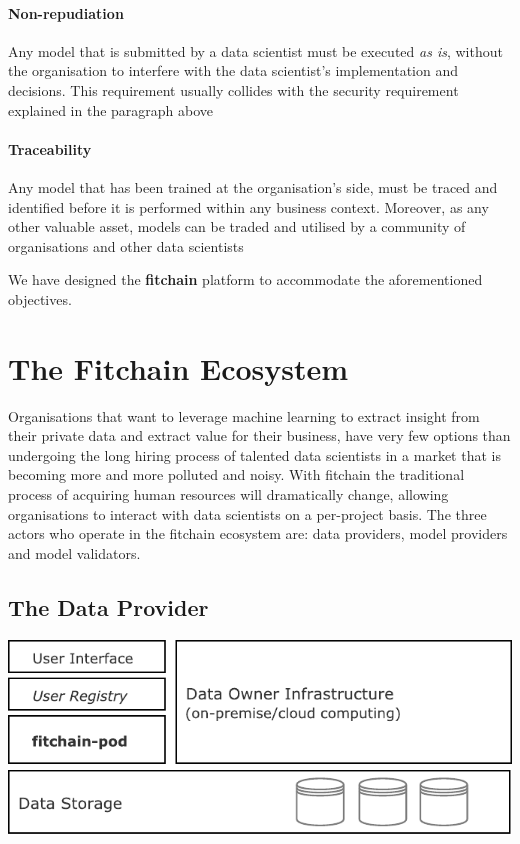 \documentclass[12pt, a4paper,titlepage]{extreport}
\begin{document}
\paragraph{Non-repudiation}
Any model that is submitted by a data scientist must be executed \textit{as is}, without the organisation to interfere with the data scientist's implementation and decisions. This requirement usually collides with the security requirement explained in the paragraph above

\paragraph{Traceability}
Any model that has been trained at the organisation's side, must be traced and identified before it is performed within any business context. Moreover, as any other valuable asset, models can be traded and utilised by a community of organisations and other data scientists

We have designed the \textbf{fitchain} platform to accommodate the aforementioned objectives. 


\section{The Fitchain Ecosystem}\label{ecosystem}
Organisations that want to leverage machine learning to extract insight from their private data and extract value for their business, have very few options than undergoing the long hiring process of talented data scientists in a market that is becoming more and more polluted and noisy\cite{forbesds}. 
With fitchain the traditional process of acquiring human resources will dramatically change, allowing organisations to interact with data scientists on a per-project basis. The three actors who operate in the fitchain ecosystem are: data providers, model providers and model validators.

\subsection{The Data Provider}

\begin{center}
\includegraphics[scale=1]{pod_dataowner.pdf} 
\end{center}
\end{document}
